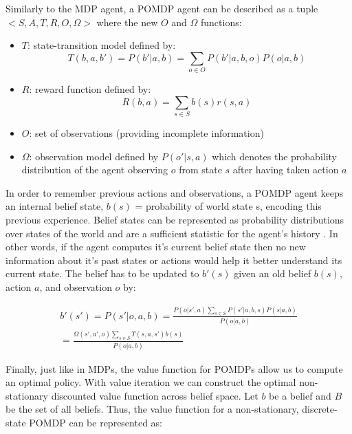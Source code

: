\documentclass[12pt]{elsarticle}
\begin{document}
Similarly to the MDP agent, a POMDP agent can be described as a tuple $<S,A,T,R,O,\Omega>$ where the new $O$ and $\Omega$ functions:
\begin{itemize}
    \item $T$: state-transition model defined by:
    \begin{equation}
    T(b,a,b') = P(b'|a,b) = \sum_{o \in O} P(b'|a,b,o)P(o|a,b)
    \end{equation} 
    \item $R$: reward function defined by:
    \begin{equation}
    R(b,a) =  \sum_{s \in S} b(s)r(s,a)
    \end{equation} 
    \item $O$: set of observations (providing incomplete information)
    \item $\Omega$: observation model defined by $P(o'|s,a)$ which denotes the probability distribution of the agent observing $o$ from state $s$ after having taken action $a$
\end{itemize}

In order to remember previous actions and observations, a POMDP agent keeps an internal belief state, $b(s)$ = probability of world state s, encoding this previous experience. Belief states can be represented as probability distributions over states of the world and are a sufficient statistic for the agent's history \cite{kaelbling1998planning}. In other words, if the agent computes it's current belief state then no new information about it's past states or actions would help it better understand its current state. The belief has to be updated to $b'(s)$ given an old belief $b(s)$, action $a$, and observation $o$ by:

\begin{equation}
\begin{aligned}
b'(s') = P(s'|o,a,b) = \frac{P(o|s',a)\sum_{s \in S}P(s'|a,b,s)P(s|a,b)}{P(o|a,b)} \\ = \frac{\Omega(s',a',o)\sum_{s \in S}T(s,a,s')b(s)}{P(o|a,b)}
\end{aligned}
\end{equation}

Finally, just like in MDPs, the value function for POMDPs allow us to compute an optimal policy. With value iteration we can construct the optimal non-stationary discounted value function across belief space. Let $b$ be a belief and $B$ be the set of all beliefs. Thus, the value function for a non-stationary, discrete-state POMDP can be represented as:
\end{document}

